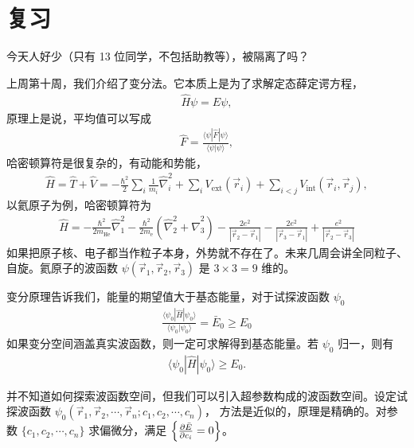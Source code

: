 \section{复习}
今天人好少（只有 13 位同学，不包括助教等），被隔离了吗？

上周第十周，我们介绍了变分法。它本质上是为了求解定态薛定谔方程，
\begin{align}
    \hat H \psi = E \psi,
\end{align}
原理上是说，平均值可以写成
\begin{align}
    \hat F = \frac{\langle \psi | \hat F | \psi \rangle}{\langle \psi | \psi \rangle},
\end{align}
哈密顿算符是很复杂的，有动能和势能，
\begin{align}
    \hat H = \hat T + \hat V = -\frac{\hbar^2}{2} \sum_i \frac{1}{m_i}\hat \nabla_i^2
    + \sum_i V_{\mathrm{ext}}(\vec r_i) 
    +\sum_{i<j}V_{\mathrm{int}}(\vec r_i, \vec r_j),
\end{align}
以氦原子为例，哈密顿算符为
\begin{align}
    \hat H = 
    -\frac{\hbar^2}{2m_{\mathrm{He}}} \hat \nabla_1^2
    -\frac{\hbar^2}{2m_{\mathrm{e}}} \left(\hat \nabla_2^2 + \hat \nabla_3^2\right)
    - \frac{2e^2}{|\vec r_2 - \vec r_1|} - \frac{2e^2}{|\vec r_3 - \vec r_1|}
    + \frac{e^2}{|\vec r_2 - \vec r_3|}
\end{align}
如果把原子核、电子都当作粒子本身，外势就不存在了。未来几周会讲全同粒子、自旋。氦原子的波函数 $\psi(\vec r_1, \vec r_2, \vec r_3)$ 是 $3\times3=9$ 维的。

变分原理告诉我们，能量的期望值大于基态能量，对于试探波函数 $\psi_0$
\begin{align}
    \frac{\langle \psi_0 | \hat H | \psi_0 \rangle}{\langle \psi_0 | \psi_0 \rangle} = \bar E_0 \geqslant E_0
\end{align}
如果变分空间涵盖真实波函数，则一定可求解得到基态能量。若 $\psi_0$ 归一，则有
\begin{align}
    \langle \psi_0 | \hat H | \psi_0 \rangle \geqslant E_0. 
\end{align}

并不知道如何探索波函数空间，但我们可以引入超参数构成的波函数空间。设定试探波函数 $\psi_0(\vec r_1, \vec r_2, \cdots, \vec r_n; c_1, c_2, \cdots, c_n)$，
方法是近似的，原理是精确的。对参数 $\{c_1, c_2, \cdots, c_n\}$ 求偏微分，满足 $\left\{\pdv{\bar E}{c_i}=0\right\}$。

